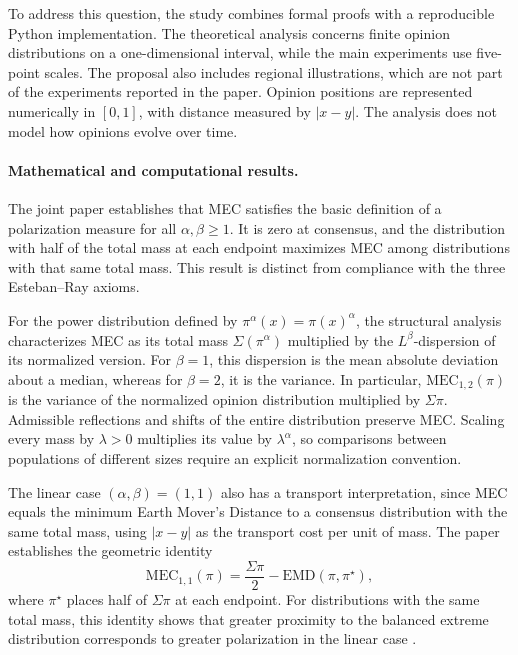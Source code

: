 \documentclass{article}
\theoremstyle{plain}
\theoremstyle{remark}
\begin{document}
To address this question, the study combines formal proofs with a reproducible Python implementation. The theoretical analysis concerns finite opinion distributions on a one-dimensional interval, while the main experiments use five-point scales. The proposal also includes regional illustrations, which are not part of the experiments reported in the paper. Opinion positions are represented numerically in $[0,1]$, with distance measured by $|x-y|$. The analysis does not model how opinions evolve over time.

\paragraph{Mathematical and computational results.}
The joint paper \citep{aranda2026mec} establishes that MEC satisfies the basic definition of a polarization measure for all $\alpha,\beta\geq1$. It is zero at consensus, and the distribution with half of the total mass at each endpoint maximizes MEC among distributions with that same total mass. This result is distinct from compliance with the three Esteban--Ray axioms.

For the power distribution defined by $\pi^\alpha(x)=\pi(x)^\alpha$, the structural analysis characterizes MEC as its total mass $\Sigma(\pi^\alpha)$ multiplied by the $L^\beta$-dispersion of its normalized version. For $\beta=1$, this dispersion is the mean absolute deviation about a median, whereas for $\beta=2$, it is the variance. In particular, $\mathrm{MEC}_{1,2}(\pi)$ is the variance of the normalized opinion distribution multiplied by $\Sigma\pi$. Admissible reflections and shifts of the entire distribution preserve MEC. Scaling every mass by $\lambda>0$ multiplies its value by $\lambda^\alpha$, so comparisons between populations of different sizes require an explicit normalization convention.

The linear case $(\alpha,\beta)=(1,1)$ also has a transport interpretation, since MEC equals the minimum Earth Mover's Distance to a consensus distribution with the same total mass, using $|x-y|$ as the transport cost per unit of mass. The paper establishes the geometric identity
\begin{equation}\label{eq:MEC-extremal-intro}
\mathrm{MEC}_{1,1}(\pi)
  = \frac{\Sigma\pi}{2}-\mathrm{EMD}(\pi,\pi^\star),
\end{equation}
where $\pi^\star$ places half of $\Sigma\pi$ at each endpoint. For distributions with the same total mass, this identity shows that greater proximity to the balanced extreme distribution corresponds to greater polarization in the linear case \citep{aranda2026mec}.
\end{document}
